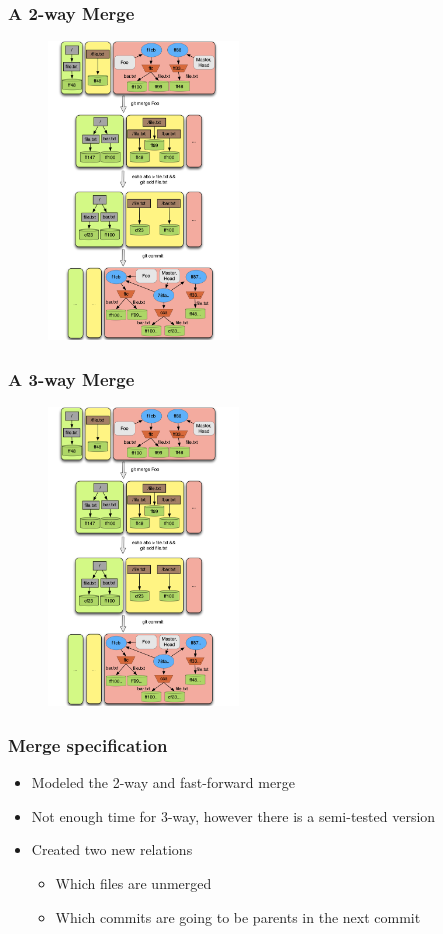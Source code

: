 \documentclass{beamer}
\begin{document}
\begin{frame}[fragile]
   \frametitle{A 2-way Merge}
   \begin{figure}
      \centering
      \includegraphics[width=0.45\textwidth]{images/merge2way.png}
   \end{figure}
\end{frame}

\begin{frame}[fragile]
   \frametitle{A 3-way Merge}
   \begin{figure}
      \centering
      \includegraphics[width=0.45\textwidth]{images/merge2way.png}
   \end{figure}
\end{frame}

\begin{frame}[fragile]
	\frametitle{Merge specification}
	\begin{itemize}
	\item Modeled the 2-way and fast-forward merge
	\item Not enough time for 3-way, however there is a semi-tested
	version
	\item Created two new relations
	\begin{itemize}
		\item Which files are unmerged
		\item Which commits are going to be parents in the next commit
	\end{itemize}
	\end{itemize}
\end{frame}
\end{document}

